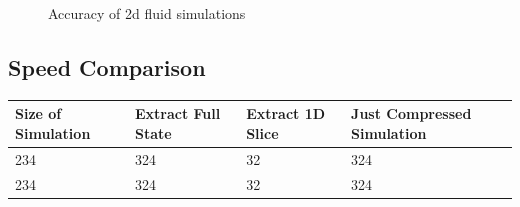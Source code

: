 \documentclass{article}
\begin{document}
\begin{figure}[!t]
\caption{Accuracy of 2d fluid simulations }
\label{fig:bouncing_balls_error_3}
\end{figure}

\subsection{Speed Comparison}

\begin{table}[]
\begin{tabular}{|l|lll|}
\hline
Size of Simulation & Extract Full State & Extract 1D Slice & Just Compressed Simulation \\ \hline
234 & 324 & 32 & 324 \\
234 & 324 & 32 & 324 \\
\hline
\end{tabular}
\end{table}
\end{document}
